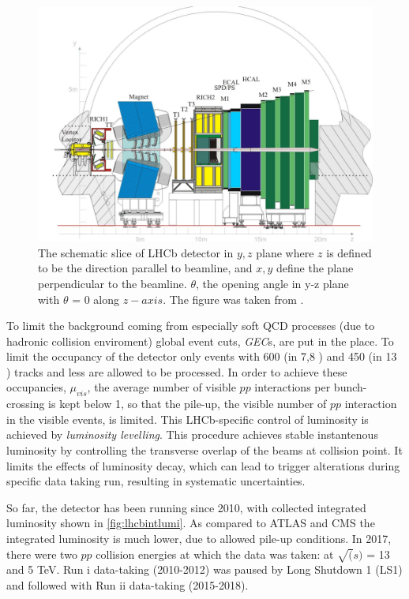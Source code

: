\begin{figure}
	\centering
	\includegraphics[scale = 0.15]{figs/detector/lhcbdet.pdf}
	\caption{The schematic slice of \Gls{LHCb} detector in $y,z$ plane where $z$ is defined to be the direction parallel to beamline, and $x,y$ define the plane perpendicular to the beamline. $\theta$, the opening angle in y-z plane with $\theta$ = 0 along $z-axis$. The figure was taken from \cite{LHCbdetector}.}
	\label{fig:LHCbDetector}
\end{figure}


To limit the background coming from especially soft QCD processes (due to hadronic collision enviroment) global event cuts, \textit{GEC}s, are put in the place. To limit the occupancy of the detector only events with 600 (in 7,8 \tev) and 450 (in 13 \tev) tracks and less are allowed to be processed. In order to achieve these occupancies, $\mu_{vis}$, the average number of visible $pp$ interactions per bunch-crossing is kept below 1, so that the pile-up, the visible number of $pp$ interaction in the visible events, is limited. This LHCb-specific control of luminosity is achieved by \textit{luminosity levelling}. This procedure achieves stable instantenous luminosity by controlling the transverse overlap of the beams at collision point. It limits the effects of luminosity decay, which can lead to trigger alterations during specific data taking run, resulting in systematic uncertainties.

So far, the detector has been running since 2010, with collected integrated luminosity shown in \autoref{fig:lhcbintlumi}. As compared to \Gls{ATLAS} and \Gls{CMS} the integrated luminosity is much lower, due to allowed pile-up conditions. In 2017, there were two $pp$ collision energies at which the data was taken: at $\sqrt(s)$  = 13 and 5 TeV. Run \Rn{1} data-taking (2010-2012) was paused by Long Shutdown 1 (\Gls{LS1}) and followed with Run \Rn{2} data-taking (2015-2018). 

